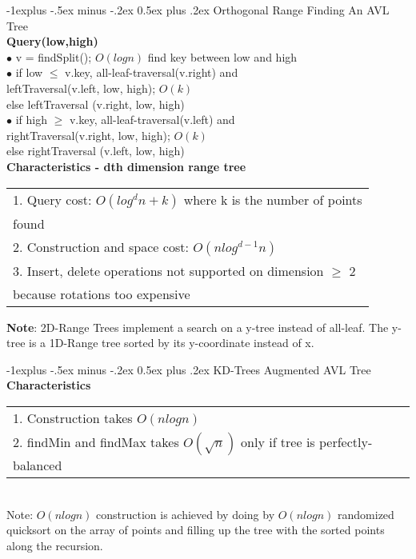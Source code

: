 \documentclass[10pt,landscape]{article}
\makeatletter
\renewcommand{\subsection}{\@startsection{subsection}{2}{0mm}%
                                {-1explus -.5ex minus -.2ex}%
                                {0.5ex plus .2ex}%
                                {\normalfont\normalsize\bfseries}}
\makeatother
\begin{document}
\begin{multicols}{3}
\subsection{Orthogonal Range Finding} 
An AVL Tree \\ 
\textbf{Query(low,high)} \\
$\bullet$ v = findSplit(); $O(logn)$ find key between low and high \\ 
$\bullet$ if low $\leq$ v.key, all-leaf-traversal(v.right) and \\ leftTraversal(v.left, low, high); $O(k)$ \\ else leftTraversal (v.right, low, high) \\ 
$\bullet$ if high $\geq$ v.key, all-leaf-traversal(v.left) and \\ rightTraversal(v.right, low, high); $O(k)$ \\ else rightTraversal (v.left, low, high) \\ 
\textbf{Characteristics - dth dimension range tree} \\
\begin{tabular}{l} 
1. Query cost: $O(log^dn + k)$ where k is the number of points \\ found \\
2. Construction and space cost: $O(nlog^{d-1}n)$ \\
3. Insert, delete operations not supported on dimension $\geq$ 2 \\ because rotations too expensive 
\end{tabular}
\textbf{Note}: 2D-Range Trees implement a search on a y-tree instead of all-leaf. The y-tree is a 1D-Range tree sorted by its y-coordinate instead of x. 

\subsection{KD-Trees} 
Augmented AVL Tree \\
\textbf{Characteristics} \\
\begin{tabular}{l}
1. Construction takes $O(nlogn)$ \\
2. findMin and findMax takes $O(\sqrt{n})$ only if tree is perfectly-balanced \\
\end{tabular} \\
Note: $O(nlogn)$ construction is achieved by doing by $O(nlogn)$ randomized quicksort on the array of points and filling up the tree with the sorted points along the recursion. 


\end{multicols}
\end{document}
